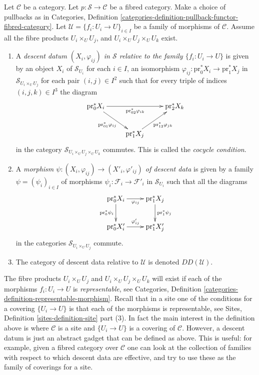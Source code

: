 \begin{definition}
\label{definition-descent-data}
Let $\mathcal{C}$ be a category.
Let $p : \mathcal{S} \to \mathcal{C}$ be a fibred category.
Make a choice of pullbacks as in Categories,
Definition \ref{categories-definition-pullback-functor-fibred-category}.
Let $\mathcal{U} = \{f_i : U_i \to U\}_{i \in I}$
be a family of morphisms of $\mathcal{C}$. Assume all the fibre products
$U_i \times_U U_j$, and $U_i \times_U U_j \times_U U_k$ exist.
\begin{enumerate}
\item A {\it descent datum $(X_i, \varphi_{ij})$ in $\mathcal{S}$
relative to the family $\{f_i : U_i \to U\}$} is given by an object $X_i$
of $\mathcal{S}_{U_i}$ for each $i \in I$, an isomorphism
$\varphi_{ij} : \text{pr}_0^*X_i \to \text{pr}_1^*X_j$
in $\mathcal{S}_{U_i \times_U U_j}$ for each pair $(i, j) \in I^2$
such that for every triple of indices $(i, j, k) \in I^3$ the
diagram
$$
\xymatrix{
\text{pr}_0^*X_i \ar[rd]_{\text{pr}_{01}^*\varphi_{ij}}
\ar[rr]_{\text{pr}_{02}^*\varphi_{ik}} & &
\text{pr}_2^*X_k \\
& \text{pr}_1^*X_j \ar[ru]_{\text{pr}_{12}^*\varphi_{jk}} &
}
$$
in the category $\mathcal{S}_{U_i \times_U U_j \times_U U_k}$
commutes. This is called the {\it cocycle condition}.
\item A {\it morphism $\psi : (X_i, \varphi_{ij}) \to
(X'_i, \varphi'_{ij})$ of descent data} is given
by a family $\psi = (\psi_i)_{i\in I}$ of morphisms
$\psi_i : \mathcal{F}_i \to \mathcal{F}'_i$ in $\mathcal{S}_{U_i}$
such that all the diagrams
$$
\xymatrix{
\text{pr}_0^*X_i \ar[r]_{\varphi_{ij}} \ar[d]_{\text{pr}_0^*\psi_i}
& \text{pr}_1^*X_j \ar[d]^{\text{pr}_1^*\psi_j} \\
\text{pr}_0^*X'_i \ar[r]^{\varphi'_{ij}} &
\text{pr}_1^*X'_j \\
}
$$
in the categories $\mathcal{S}_{U_i \times_U U_j}$ commute.
\item The category of descent data relative to
$\mathcal{U}$ is denoted $DD(\mathcal{U})$.
\end{enumerate}
\end{definition}

\noindent
The fibre products $U_i \times_U U_j$ and $U_i \times_U U_j \times_U U_k$
will exist if each of the morphisms $f_i : U_i \to U$ is {\it representable},
see Categories, Definition \ref{categories-definition-representable-morphism}.
Recall that in a site one of the conditions for a covering $\{U_i \to U\}$ is
that each of the morphisms is representable, see
Sites, Definition \ref{sites-definition-site} part (3).
In fact the main interest in the definition above is where $\mathcal{C}$
is a site and $\{U_i \to U\}$ is a covering of $\mathcal{C}$. However,
a descent datum is just an abstract gadget that can be defined as above.
This is useful: for example, given a fibred category over $\mathcal{C}$
one can look at the collection of families with respect to which descent data
are effective, and try to use these as the family of coverings for a site.

